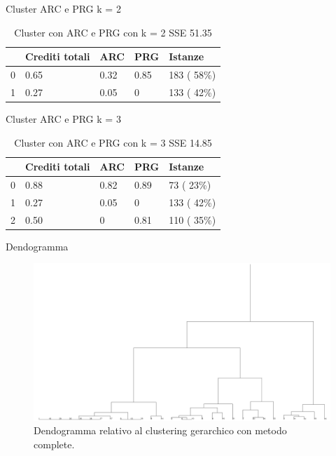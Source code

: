 \documentclass{beamer}
\begin{document}
\begin{frame}{Cluster ARC e PRG k = 2}
  \begin{table}[ht]
    \centering
    \begin{tabular}{@{}lllll@{}}
    \toprule
      & Crediti totali & ARC  & PRG  & Istanze\\ \midrule
    0 & 0.65           & 0.32 & 0.85 & 183 ( 58\%)\\
    1 & 0.27           & 0.05 & 0    & 133 ( 42\%)\\ \bottomrule
    \end{tabular}
    \caption{Cluster con ARC e PRG con k = 2 SSE 51.35}
    \label{c2AP}
  \end{table}
\end{frame}

\begin{frame}{Cluster ARC e PRG k = 3}
  \begin{table}[ht]
    \centering
    \begin{tabular}{@{}lllll@{}}
    \toprule
      & Crediti totali & ARC  & PRG  & Istanze\\ \midrule
    0 & 0.88           & 0.82 & 0.89 & 73 ( 23\%)\\
    1 & 0.27           & 0.05 & 0    & 133 ( 42\%)\\
    2 & 0.50           & 0    & 0.81 & 110 ( 35\%)\\ \bottomrule
    \end{tabular}
    \caption{Cluster con ARC e PRG con k = 3 SSE 14.85}
    \label{c3AP}
  \end{table}
\end{frame}

\begin{frame}{Dendogramma}
  \begin{figure}[bt]
    \includegraphics[width=\textwidth]{../img/hierarchical-complete.png}
    \caption{Dendogramma relativo al clustering gerarchico con metodo complete.}
  \end{figure}
\end{frame}
\end{document}
